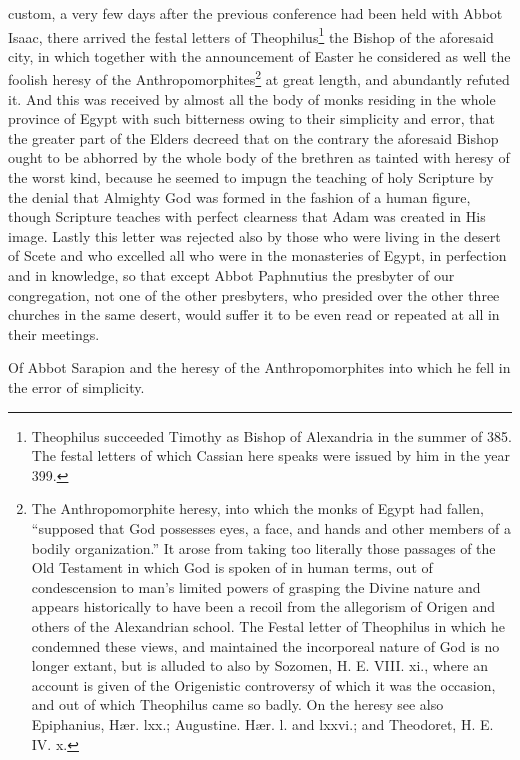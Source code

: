 custom, a very few days after the previous conference had been held with Abbot Isaac, there arrived the festal letters of Theophilus\footnote{Theophilus succeeded Timothy as Bishop of Alexandria in the summer of 385. The festal letters of which Cassian here speaks were issued by him in the year 399.} the Bishop of the aforesaid city, in which together with the announcement of Easter he considered as well the foolish heresy of the Anthropomorphites\footnote{The Anthropomorphite heresy, into which the monks of Egypt had fallen, “supposed that God possesses eyes, a face, and hands and other members of a bodily organization.” It arose from taking too literally those passages of the Old Testament in which God is spoken of in human terms, out of condescension to man’s limited powers of grasping the Divine nature and appears historically to have been a recoil from the allegorism of Origen and others of the Alexandrian school. The Festal letter of Theophilus in which he condemned these views, and maintained the incorporeal nature of God is no longer extant, but is alluded to also by Sozomen, H. E. VIII. xi., where an account is given of the Origenistic controversy of which it was the occasion, and out of which Theophilus came so badly. On the heresy see also Epiphanius, Hær. lxx.; Augustine. Hær. l. and lxxvi.; and Theodoret, H. E. IV. x.} at great length, and abundantly refuted it. And this was received by almost all the body of monks residing in the whole province of Egypt with such bitterness owing to their simplicity and error, that the greater part of the Elders decreed that on the contrary the aforesaid Bishop ought to be abhorred by the whole body of the brethren as tainted with heresy of the worst kind, because he seemed to impugn the teaching of holy Scripture by the denial that Almighty God was formed in the fashion of a human figure, though Scripture teaches with perfect clearness that Adam was created in His image. Lastly this letter was rejected also by those who were living in the desert of Scete and who excelled all who were in the monasteries of Egypt, in perfection and in knowledge, so that except Abbot Paphnutius the presbyter of our congregation, not one of the other presbyters, who presided over the other three churches in the same desert, would suffer it to be even read or repeated at all in their meetings.


Of Abbot Sarapion and the heresy of the Anthropomorphites into which he fell in the error of simplicity.


